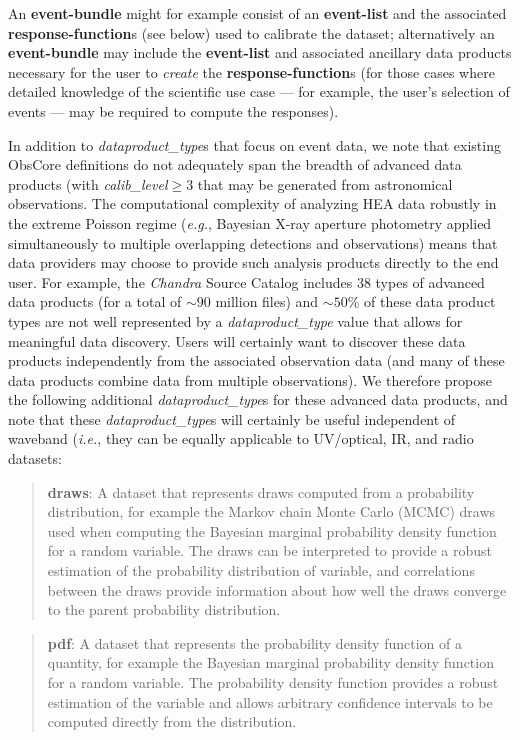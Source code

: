 \documentclass[11pt,a4paper]{ivoa}
\begin{document}
An {\bf event-bundle} might for example consist of an {\bf event-list} and the associated {\bf response-function}s (see below) used to calibrate the dataset; alternatively an {\bf event-bundle} may include the {\bf event-list}  and associated ancillary data products necessary for the user to {\em create\/} the {\bf response-function}s (for those cases where detailed knowledge of the scientific use case --- for example, the user's selection of events --- may be required to compute the responses).

In addition to {\em dataproduct\_type\/}s that focus on event data, we note that existing ObsCore definitions do not adequately span the breadth of advanced data products (with {\em calib\_level\/}${}\ge 3$ that may be generated from astronomical observations.   The computational complexity of analyzing HEA data robustly in the extreme Poisson regime ({\em e.g.\/}, Bayesian X-ray aperture photometry applied simultaneously to multiple overlapping detections and observations) means that data providers may choose to provide such analysis products directly to the end user.  For example, the {\em Chandra\/} Source Catalog includes 38 types of advanced data products  (for a total of $\sim\!90$ million files) and $\sim\!50\%$ of these data product types are not well represented by a {\em dataproduct\_type} value that allows for meaningful data discovery.  Users will certainly want to discover these data products independently from the associated observation data (and many of these data products combine data from multiple observations).  We therefore propose the following additional {\em dataproduct\_type}s for these advanced data products, and note that these {\em dataproduct\_type}s will certainly be useful independent of waveband ({\em i.e.\/}, they can be equally applicable to UV/optical, IR, and radio datasets:

\begin{quote}
{\bf draws}:  A dataset that represents draws computed from a probability distribution, for example the Markov chain Monte Carlo (MCMC) draws used when computing the Bayesian marginal probability density function for a random variable.  The draws can be interpreted to provide a robust estimation of the probability distribution of variable, and correlations between the draws provide information about how well the draws converge to the parent probability distribution.
\end{quote}

\begin{quote}
{\bf pdf}: A dataset that represents the probability density function of a quantity, for example the Bayesian marginal probability density function for a random variable.  The probability density function provides a robust estimation of the variable and allows arbitrary confidence intervals to be computed directly from the distribution.
\end{quote}
\end{document}

